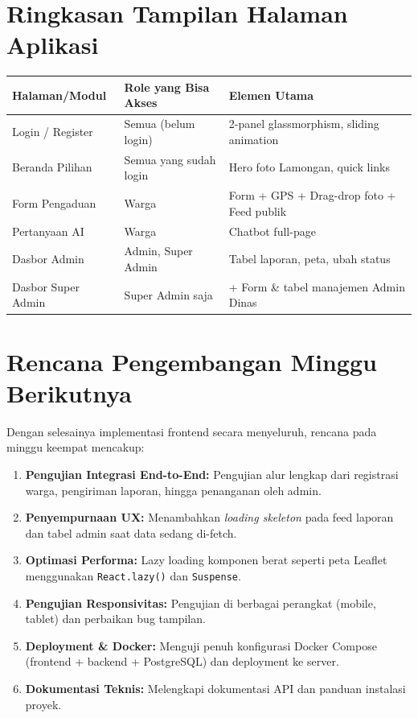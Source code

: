 \documentclass[12pt,a4paper]{article}
\begin{document}
\section{Ringkasan Tampilan Halaman Aplikasi}

\begin{center}
\begin{longtable}{p{3.8cm}p{3.8cm}p{5cm}}
  \toprule
  \textbf{Halaman/Modul} & \textbf{Role yang Bisa Akses} & \textbf{Elemen Utama} \\
  \midrule
  Login / Register & Semua (belum login) & 2-panel glassmorphism, sliding animation \\
  Beranda Pilihan & Semua yang sudah login & Hero foto Lamongan, quick links \\
  Form Pengaduan & Warga & Form + GPS + Drag-drop foto + Feed publik \\
  Pertanyaan AI & Warga & Chatbot full-page \\
  Dasbor Admin & Admin, Super Admin & Tabel laporan, peta, ubah status \\
  Dasbor Super Admin & Super Admin saja & + Form \& tabel manajemen Admin Dinas \\
  \bottomrule
\end{longtable}
\end{center}

\section{Rencana Pengembangan Minggu Berikutnya}

Dengan selesainya implementasi frontend secara menyeluruh, rencana pada minggu
keempat mencakup:

\begin{enumerate}[leftmargin=2em, itemsep=6pt]
  \item \textbf{Pengujian Integrasi End-to-End:} Pengujian alur lengkap dari
        registrasi warga, pengiriman laporan, hingga penanganan oleh admin.
  \item \textbf{Penyempurnaan UX:} Menambahkan \textit{loading skeleton} pada
        feed laporan dan tabel admin saat data sedang di-fetch.
  \item \textbf{Optimasi Performa:} Lazy loading komponen berat seperti peta
        Leaflet menggunakan \texttt{React.lazy()} dan \texttt{Suspense}.
  \item \textbf{Pengujian Responsivitas:} Pengujian di berbagai perangkat
        (mobile, tablet) dan perbaikan bug tampilan.
  \item \textbf{Deployment \& Docker:} Menguji penuh konfigurasi Docker Compose
        (frontend + backend + PostgreSQL) dan deployment ke server.
  \item \textbf{Dokumentasi Teknis:} Melengkapi dokumentasi API dan panduan
        instalasi proyek.
\end{enumerate}
\end{document}
